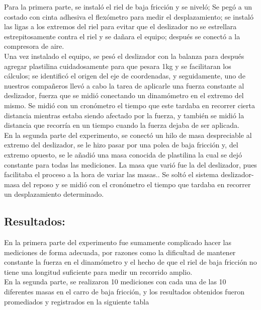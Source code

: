 \documentclass{article}
\begin{document}
Para la primera parte, se instaló el riel de baja fricción y se niveló; Se pegó a un costado con cinta adhesiva el flexómetro para medir el desplazamiento; se instaló las ligas a los extremos del riel para evitar que el deslizador no se estrellara estrepitosamente contra el riel y se dañara el equipo; después se conectó a la compresora de aire. \\
Una vez instalado el equipo, se pesó el deslizador con la balanza para después agregar plastilina cuidadosamente para que pesara 1kg  y se facilitaran los cálculos; se identificó el origen del eje de coordenadas, y seguidamente, uno de nuestros compañeros llevó a cabo la tarea de aplicarle una fuerza constante al deslizador, fuerza que se midió conectando un dinamómetro en el extremo del mismo. Se midió con un cronómetro el tiempo que este tardaba en recorrer cierta distancia mientras estaba siendo afectado por la fuerza, y también se midió la distancia que recorría en un tiempo cuando la fuerza dejaba de ser aplicada.\\

En la segunda parte del experimento, se conectó un hilo de masa despreciable al extremo del deslizador, se le hizo pasar por una polea de baja fricción y, del extremo opuesto, se le añadió una masa conocida de plastilina la cual se dejó constante para todas las mediciones. La masa que varió fue la del deslizador, pues facilitaba el proceso a la hora de variar las masas.. Se soltó el sistema deslizador-masa del reposo y se midió con el cronómetro el tiempo que tardaba en recorrer un desplazamiento determinado.\\

\subsection{Resultados:}
En la primera parte del experimento fue sumamente complicado hacer las mediciones de forma adecuada, por razones como la dificultad de mantener constante la fuerza en el dinamómetro y el hecho de que el riel de baja fricción no tiene una longitud suficiente para medir un recorrido amplio.\\

En la segunda parte, se realizaron 10 mediciones con cada una de las 10 diferentes masas en el carro de baja fricción, y los resultados obtenidos fueron promediados y registrados en la siguiente tabla\\
\end{document}
